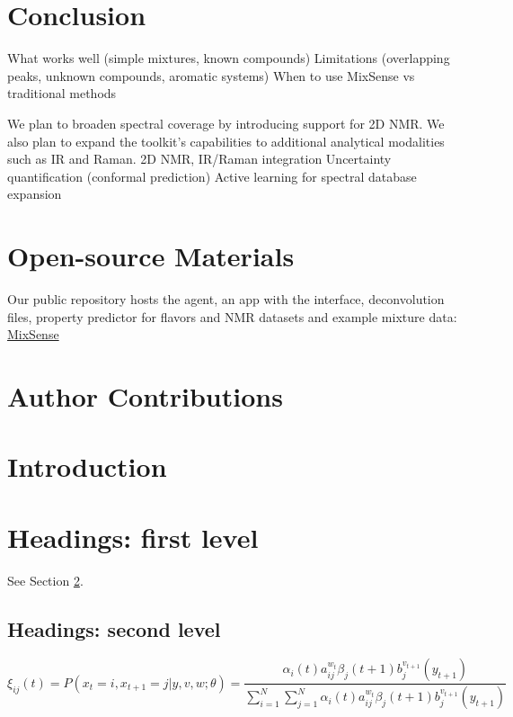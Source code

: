 \documentclass{article}
\begin{document}
\section*{Conclusion}
What works well (simple mixtures, known compounds)
Limitations (overlapping peaks, unknown compounds, aromatic systems)
When to use MixSense vs traditional methods

We plan to broaden spectral coverage by introducing support for 2D NMR. We also plan to expand the toolkit's capabilities to additional analytical modalities such as IR and Raman. 2D NMR, IR/Raman integration
Uncertainty quantification (conformal prediction)
Active learning for spectral database expansion


\section*{Open-source Materials}
Our public repository hosts the agent, an app with the interface, deconvolution files, property predictor for flavors and NMR datasets and example mixture data: 
\href{https://github.com/jdsanc/MixSense.git}{MixSense \faGithubSquare}

\section*{Author Contributions}
\section{Introduction}
\lipsum[2]
\lipsum[3]


\section{Headings: first level}
\label{sec:headings}

\lipsum[4] See Section \ref{sec:headings}.

\subsection{Headings: second level}
\lipsum[5]
\begin{equation}
	\xi _{ij}(t)=P(x_{t}=i,x_{t+1}=j|y,v,w;\theta)= {\frac {\alpha _{i}(t)a^{w_t}_{ij}\beta _{j}(t+1)b^{v_{t+1}}_{j}(y_{t+1})}{\sum _{i=1}^{N} \sum _{j=1}^{N} \alpha _{i}(t)a^{w_t}_{ij}\beta _{j}(t+1)b^{v_{t+1}}_{j}(y_{t+1})}}
\end{equation}
\end{document}
